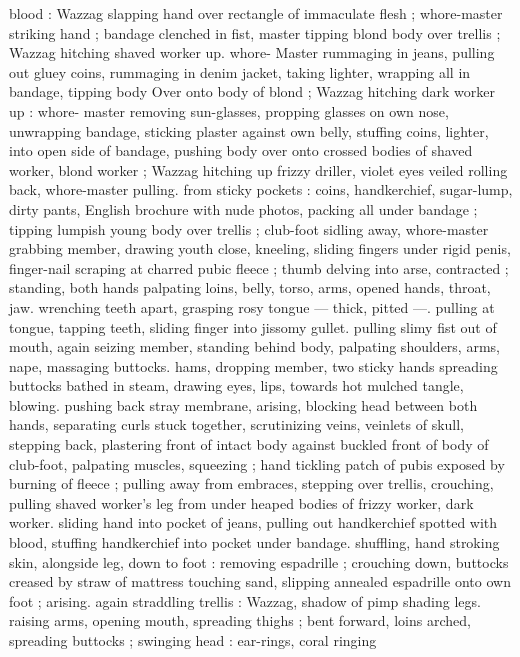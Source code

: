 blood : Wazzag slapping hand over rectangle of immaculate flesh ; 
whore-master striking hand ; bandage clenched in fist, master tipping 
blond body over trellis ; Wazzag hitching shaved worker up. whore- 
Master rummaging in jeans, pulling out gluey coins, rummaging in 
denim jacket, taking lighter, wrapping all in bandage, tipping body 
Over onto body of blond ; Wazzag hitching dark worker up : whore- 
master removing sun-glasses, propping glasses on own nose, 
unwrapping bandage, sticking plaster against own belly, stuffing 
coins, lighter, into open side of bandage, pushing body over onto 
crossed bodies of shaved worker, blond worker ; Wazzag hitching up 
frizzy driller, violet eyes veiled rolling back, whore-master pulling. 
from sticky pockets : coins, handkerchief, sugar-lump, dirty pants, 
English brochure with nude photos, packing all under bandage ; 
tipping lumpish young body over trellis ; club-foot sidling away, 
whore-master grabbing member, drawing youth close, kneeling, 
sliding fingers under rigid penis, finger-nail scraping at charred 
pubic fleece ; thumb delving into arse, contracted ; standing, both 
hands palpating loins, belly, torso, arms, opened hands, throat, jaw. 
wrenching teeth apart, grasping rosy tongue --- thick, pitted ---. 
pulling at tongue, tapping teeth, sliding finger into jissomy gullet. 
pulling slimy fist out of mouth, again seizing member, standing 
behind body, palpating shoulders, arms, nape, massaging buttocks. 
hams, dropping member, two sticky hands spreading buttocks bathed 
in steam, drawing eyes, lips, towards hot mulched tangle, blowing. 
pushing back stray membrane, arising, blocking head between both 
hands, separating curls stuck together, scrutinizing veins, veinlets of 
skull, stepping back, plastering front of intact body against buckled 
front of body of club-foot, palpating muscles, squeezing ; hand 
tickling patch of pubis exposed by burning of fleece ; pulling away 
from embraces, stepping over trellis, crouching, pulling shaved 
worker's leg from under heaped bodies of frizzy worker, dark worker. 
sliding hand into pocket of jeans, pulling out handkerchief spotted 
with blood, stuffing handkerchief into pocket under bandage. 
shuffling, hand stroking skin, alongside leg, down to foot : removing 
espadrille ; crouching down, buttocks creased by straw of mattress 
touching sand, slipping annealed espadrille onto own foot ; arising. 
again straddling trellis : Wazzag, shadow of pimp shading legs. 
raising arms, opening mouth, spreading thighs ; bent forward, loins 
arched, spreading buttocks ; swinging head : ear-rings, coral ringing 
